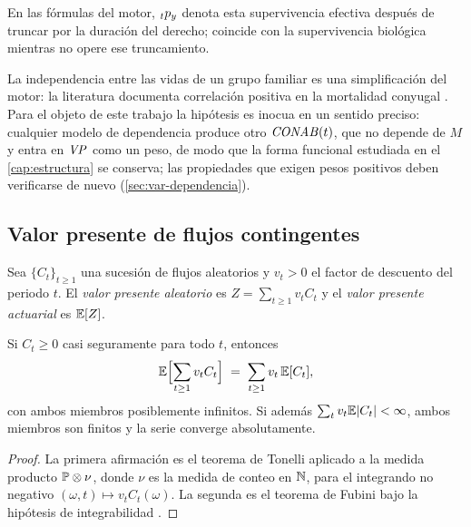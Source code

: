 En las fórmulas del motor, ${}_{t}p_{y}$ denota esta supervivencia efectiva
después de truncar por la duración del derecho; coincide con la supervivencia
biológica mientras no opere ese truncamiento.

\begin{remark}
La independencia entre las vidas de un grupo familiar es una simplificación del
motor: la literatura documenta correlación positiva en la mortalidad conyugal
\citep{frees1996}. Para el objeto de este trabajo la hipótesis es inocua en un
sentido preciso: cualquier modelo de dependencia produce otro $\mathit{CONAB}(t)$, que no
depende de $M$ y entra en $\mathit{VP}$ como un peso, de modo que la forma funcional
estudiada en el \cref{cap:estructura} se conserva; las propiedades que exigen
pesos positivos deben verificarse de nuevo (\cref{sec:var-dependencia}).
\end{remark}

\subsection{Valor presente de flujos contingentes}

\begin{definition}
Sea $\{C_t\}_{t\ge1}$ una sucesión de flujos aleatorios y $v_t>0$ el factor de
descuento del periodo $t$. El \emph{valor presente aleatorio} es
$Z=\sum_{t\ge1}v_tC_t$ y el \emph{valor presente actuarial} es $\mathbb{E}[Z]$.
\end{definition}

\begin{theorem}
\label{thm:tonelli}
Si $C_t\ge0$ casi seguramente para todo $t$, entonces
\begin{equation}
\label{eq:tonelli}
  \mathbb{E}\Bigl[\sum_{t\ge1}v_tC_t\Bigr]\;=\;\sum_{t\ge1}v_t\,\mathbb{E}[C_t],
\end{equation}
con ambos miembros posiblemente infinitos. Si además
$\sum_t v_t\mathbb{E}|C_t|<\infty$, ambos miembros son finitos y la serie converge
absolutamente.
\end{theorem}
\begin{proof}
La primera afirmación es el teorema de Tonelli aplicado a la medida producto
$\mathbb{P}\otimes\nu$, donde $\nu$ es la medida de conteo en $\mathbb{N}$, para el integrando
no negativo $(\omega,t)\mapsto v_tC_t(\omega)$. La segunda es el teorema de Fubini
bajo la hipótesis de integrabilidad \citep[cap.~18]{billingsley1995}.
\end{proof}

